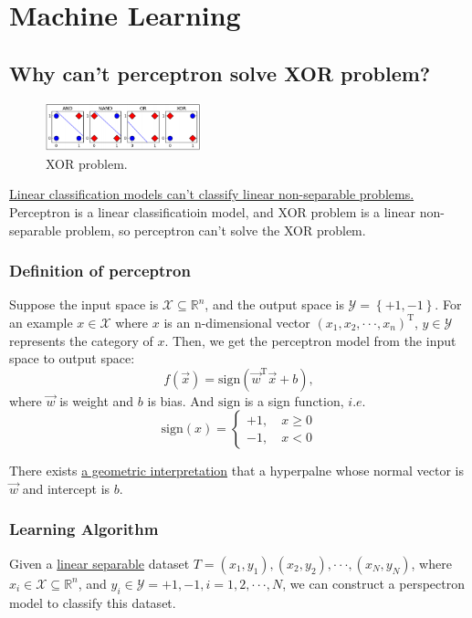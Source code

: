 \documentclass[10pt,onecolumn]{book}
\begin{document}
\chapter{Machine Learning}

\section{Why can't perceptron solve XOR problem?}
\label{sect:perceptron}
\begin{figure}
\centering
\includegraphics[width=0.4\textwidth]{figures/XOR_problem.png}
\caption{XOR problem.}
\end{figure}
 \uline{Linear classification models can't classify linear non-separable problems.} Perceptron is a linear classificatioin model, and XOR problem is a linear non-separable problem, so perceptron can't solve the XOR problem.

\subsection{Definition of perceptron}
Suppose the input space is $\mathcal{X} \subseteq \mathbb{R}^n$, and the output space is $\mathcal{Y} = \left\{+1, -1\right\}$. For an example $x \in \mathcal{X}$ where $x$ is an n-dimensional vector $(x_{1}, x_{2}, \cdot \cdot \cdot, x_{n})^\mathrm{T}$, $y \in \mathcal{Y}$ represents the category of $x$. Then, we get the perceptron model from the input space to output space: 
\begin{equation}
f(\vec{x}) = \mathrm{sign}(\vec{w}^\mathrm{T} \vec{x} + b),
\end{equation}
where $\vec{w}$ is weight and $b$ is bias. And $\mathrm{sign}$ is a sign function, $i. e.$
\begin{equation}
\mathrm{sign}(x)=
\left\{
	\begin{array}{ll}
		+1, \quad x \ge 0  \\
		-1, \quad x < 0
	\end{array}
\right.
\end{equation}

There exists \uline{a geometric interpretation} that a hyperpalne whose normal vector is $\vec{w}$ and intercept is $b$.

\subsection{Learning Algorithm}
Given a \uline{linear separable} dataset $T = {(x_{1}, y_{1}), (x_{2}, y_{2}), \cdot \cdot \cdot, (x_{N}, y_{N})}$, where $x_{i} \in \mathcal{X} \subseteq \mathbb{R}^n$, and $y_{i} \in \mathcal{Y} = {+1, -1}, i = 1, 2, \cdot \cdot \cdot, N$, we can construct a perspectron model to classify this dataset. 
\end{document}
